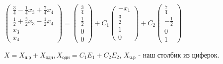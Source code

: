 \documentclass{article}
\begin{document}
\begin{flushleft}
$\begin{pmatrix}
    \frac{3}{4} - \frac{1}{4}x_3 + \frac{7}{4}x_4 \\
    \frac{1}{2} + \frac{3}{2}x_3 - \frac{1}{2}x_4 \\
    x_3 \\
    x_4
\end{pmatrix} = \begin{pmatrix}
    \frac{3}{4} \\
    \frac{1}{2} \\
    0 \\
    0
\end{pmatrix} + C_1 \begin{pmatrix}
    -x_1 \\
    \frac{3}{2} \\
    1 \\
    0
\end{pmatrix} + C_2 \begin{pmatrix}
    \frac{7}{4} \\
    -\frac{1}{2} \\
    0 \\
    1
\end{pmatrix}$

\hfill

$X = X_{\text{ч.р}} + X_{\text{одн}}, X_{\text{одн}} = C_1E_1 + C_2E_2$, $X_{\text{ч.р}}$ - наш столбик из циферок.

\end{flushleft}
\end{document}

